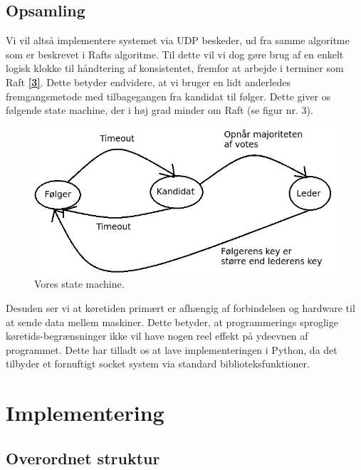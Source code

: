 \documentclass[a4paper,12pt]{article}
\begin{document}
\subsection{Opsamling}
Vi vil altså implementere systemet via UDP beskeder, ud fra samme algoritme som er beskrevet i Rafts algoritme. Til dette vil vi dog gøre brug af en enkelt logisk klokke til håndtering af konsistentet, fremfor at arbejde i terminer som Raft \hyperref[tre]{\textbf{[3]}}. Dette betyder endvidere, at vi bruger en lidt anderledes fremgangsmetode med tilbagegangen fra kandidat til følger. Dette giver os følgende state machine, der i høj grad minder om Raft (se figur nr. 3). \\
\begin{figure}[H]
  \caption{Vores state machine.}
  \centering
    \includegraphics[width=1\textwidth]{State-machine.png}
\end{figure}
Desuden ser vi at køretiden primært er afhængig af forbindelsen og hardware til at sende data mellem maskiner. Dette betyder, at programmerings sproglige køretids-begrænsninger ikke vil have nogen reel effekt på ydeevnen af programmet. Dette har tilladt os at lave implementeringen i Python, da det tilbyder et fornuftigt socket system via standard biblioteksfunktioner.
\newpage

\section{Implementering} 
\subsection{Overordnet struktur} 
\end{document}
